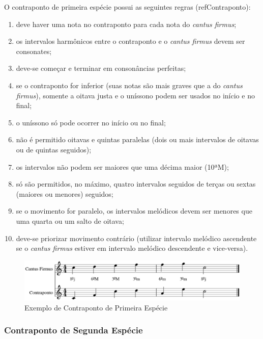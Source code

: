         O contraponto de primeira espécie possui as seguintes regras (refContraponto):

        \begin{enumerate}
          \item deve haver uma nota no contraponto para cada nota do \textit{cantus firmus};
          \item os intervalos harmônicos entre o contraponto e o \textit{cantus firmus} devem ser consonates;
          \item deve-se começar e terminar em consonâncias perfeitas;
          \item se o contraponto for inferior (suas notas são mais graves que a do \textit{cantus firmus}), somente a oitava justa e o uníssono podem ser usados no início e no final;
          \item o uníssono só pode ocorrer no início ou no final;
          \item não é permitido oitavas e quintas paralelas (dois ou mais intervalos de oitavas ou de quintas seguidos);
          \item os intervalos não podem ser maiores que uma décima maior (10ªM);
          \item só são permitidos, no máximo, quatro intervalos seguidos de terças ou sextas (maiores ou menores) seguidos;
          \item se o movimento for paralelo, os intervalos melódicos devem ser menores que uma quarta ou um salto de oitava;
          \item deve-se priorizar movimento contrário (utilizar intervalo melódico ascendente se o \textit{cantus firmus} estiver em intervalo melódico descendente e vice-versa).
        \end{enumerate}

        \begin{figure}[htb]
          \centering
          \includegraphics[scale=0.55]{figuras/contrapontoprimeira.eps}
          \caption{Exemplo de Contraponto de Primeira Espécie}
          \label{contrapontoprimeira}
        \end{figure}

      \subsubsection[Contraponto de Segunda Espécie]{Contraponto de Segunda Espécie}

